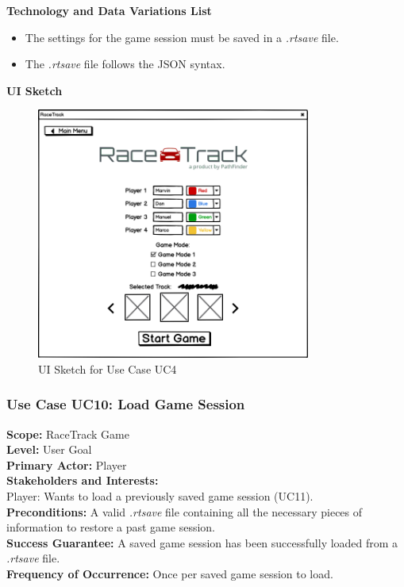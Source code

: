			\textbf{Technology and Data Variations List}
				\begin{itemize}
					\item The settings for the game session must be saved in a \textit{.rtsave} file.
					\item The \textit{.rtsave} file follows the JSON syntax.
				\end{itemize}

			\newpage
	
			\textbf{UI Sketch}
				\begin{figure}[H]
					\centering
					\includegraphics[width=9cm,keepaspectratio,center]{img/Use-Case-Model_UC4_UI-Sketch.png}
					\caption{UI Sketch for Use Case UC4}
				\end{figure}

		\subsubsection{Use Case UC10: Load Game Session}
			\textbf{Scope:} RaceTrack Game \\
			\textbf{Level:} User Goal \\
			\textbf{Primary Actor:} Player \\
			\textbf{Stakeholders and Interests:} \\
			Player: Wants to load a previously saved game session (UC11). \\
			\textbf{Preconditions:} A valid \textit{.rtsave} file containing all the necessary pieces of information to restore a past game session. \\
			\textbf{Success Guarantee:} A saved game session has been successfully loaded from a \textit{.rtsave} file. \\
			\textbf{Frequency of Occurrence:} Once per saved game session to load.
			\newline
		
